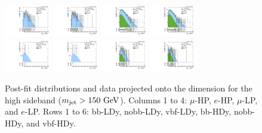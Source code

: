 \begin{figure}[htbp]
  \includegraphics[width=0.18\textwidth]{fig/fitValidation/PostFit_SR_MVV_MJJ150to210__mu_HP_nobb_HDy_Run2.pdf}
  \includegraphics[width=0.18\textwidth]{fig/fitValidation/PostFit_SR_MVV_MJJ150to210__e_HP_nobb_HDy_Run2.pdf}
  \includegraphics[width=0.18\textwidth]{fig/fitValidation/PostFit_SR_MVV_MJJ150to210__mu_LP_nobb_HDy_Run2.pdf}
  \includegraphics[width=0.18\textwidth]{fig/fitValidation/PostFit_SR_MVV_MJJ150to210__e_LP_nobb_HDy_Run2.pdf}\\
  \includegraphics[width=0.18\textwidth]{fig/fitValidation/PostFit_SR_MVV_MJJ150to210__mu_HP_vbf_HDy_Run2.pdf}
  \includegraphics[width=0.18\textwidth]{fig/fitValidation/PostFit_SR_MVV_MJJ150to210__e_HP_vbf_HDy_Run2.pdf}
  \includegraphics[width=0.18\textwidth]{fig/fitValidation/PostFit_SR_MVV_MJJ150to210__mu_LP_vbf_HDy_Run2.pdf}
  \includegraphics[width=0.18\textwidth]{fig/fitValidation/PostFit_SR_MVV_MJJ150to210__e_LP_vbf_HDy_Run2.pdf}\\
  \caption{
    Post-fit distributions and data projected onto the \MVV dimension for the high \MJ sideband ($\MJ>150\unit{GeV}$).
    Columns 1 to 4: $\mu$-HP, $e$-HP, $\mu$-LP, and $e$-LP.
    Rows 1 to 6: bb-LDy, nobb-LDy, vbf-LDy, bb-HDy, nobb-HDy, and vbf-HDy.
  }
  \label{fig:postfit_MVV_MJJ150to210_Run2}
\end{figure}

